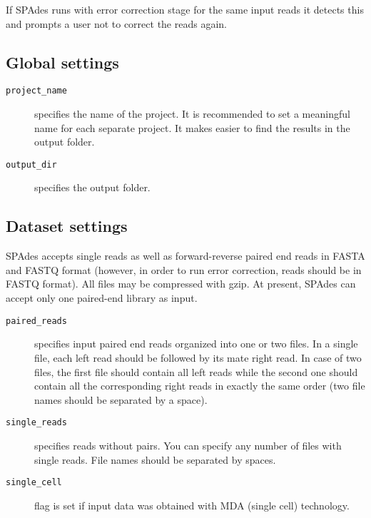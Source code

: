 \documentclass{article}
\def\spades{SPAdes}
\begin{document}
If {\spades} runs with error correction stage for the same input reads it detects this and prompts a user not to correct the reads again. 

\subsection{Global settings}
\begin{description}
\item[{\tt project\_name}] specifies the name of the project. It is recommended to set a meaningful name for each separate project.
It makes easier to find the results in the output folder.
\item[{\tt output\_dir}] specifies the output folder.
\end{description}

\subsection{Dataset settings}
{\spades} accepts single reads as well as forward-reverse paired end reads
in FASTA and FASTQ format (however, in order to run error correction, reads should be in FASTQ format). All files may be compressed with gzip.
At present, {\spades} can accept only one paired-end library as input.

\begin{description}
\item[{\tt paired\_reads}] specifies input paired end reads organized into one or two files.
In a single file, each left read should be followed by its mate right read.
In case of two files, the first file should contain all left reads while the second one should contain
all the corresponding right reads in exactly the same order (two file names should be separated by a space).
\item[{\tt single\_reads}] specifies reads without pairs. You can specify any number of
files with single reads. File names should be separated by spaces.
\item[{\tt single\_cell}] flag is set if input data was obtained with MDA (single cell) technology.
\end{description}
\end{document}
